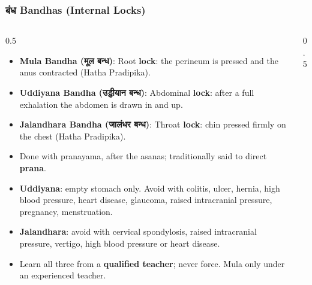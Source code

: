 \begin{frame}[fragile,shrink=6]\frametitle{बंध  Bandhas (Internal Locks)}\footnotesize


\begin{columns}
    \begin{column}[T]{0.5\linewidth}
      \begin{itemize}
        \item \textbf{Mula Bandha (मूल बन्ध)}: Root \textbf{lock}: the perineum is pressed and the anus contracted (Hatha Pradipika).
        \item \textbf{Uddiyana Bandha (उड्डीयान बन्ध)}: Abdominal \textbf{lock}: after a full exhalation the abdomen is drawn in and up.
        \item \textbf{Jalandhara Bandha (जालंधर बन्ध)}: Throat \textbf{lock}: chin pressed firmly on the chest (Hatha Pradipika).
        \item Done with pranayama, after the asanas; traditionally said to direct \textbf{prana}.
        \item \textbf{Uddiyana}: empty stomach only. Avoid with colitis, ulcer, hernia, high blood pressure, heart disease, glaucoma, raised intracranial pressure, pregnancy, menstruation.
        \item \textbf{Jalandhara}: avoid with cervical spondylosis, raised intracranial pressure, vertigo, high blood pressure or heart disease.
        \item Learn all three from a \textbf{qualified teacher}; never force. Mula only under an experienced teacher.
      \end{itemize}
    \end{column}
    \begin{column}[T]{0.5\linewidth}
        \begin{center}

\end{center}
\end{column}
\end{columns}
\end{frame}
